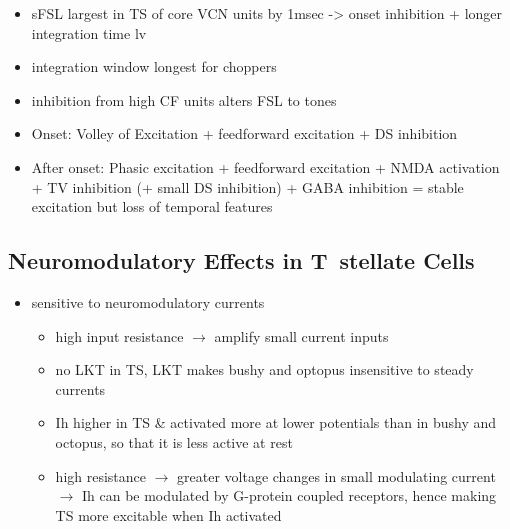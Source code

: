 \begin{itemize}
\item sFSL largest in TS of core VCN units by 1msec -> onset inhibition + longer integration time \citep{GisbergenGrashuisEtAl:1975,GisbergenGrashuisEtAl:1975a,GisbergenGrashuisEtAl:1975b,YoungRobertEtAl:1988,PaoliniClareyEtAl:2004}
  lv\item integration window longest for choppers \citep{McGinleyOertel:2006}
\item inhibition from high CF units alters FSL to tones \citep{Wickesberg:1996}
\item Onset: Volley of Excitation + feedforward excitation + DS inhibition
\item After onset: Phasic excitation + feedforward excitation + NMDA activation + TV inhibition (+ small DS inhibition) + GABA inhibition = stable excitation but loss of temporal features
\end{itemize}

\citep{JorisSmithEtAl:1994}


\subsection{Neuromodulatory Effects in T~stellate Cells}




\begin{itemize}
\item sensitive to neuromodulatory currents \citep{FujinoOertel:2001}
\begin{itemize}
\item high input resistance $\rightarrow$ amplify small current inputs \citep{FujinoOertel:2001}
\item no LKT in TS,  LKT makes bushy and optopus insensitive to steady currents \citep{OertelFujino:2001,McGinleyOertel:2006}
\item Ih higher in TS \& activated more at lower potentials than in bushy and octopus, so that it is less active at rest
\item high resistance $\rightarrow$ greater voltage changes in small modulating current $\rightarrow$ Ih can be modulated by G-protein coupled receptors, hence making TS more excitable when Ih activated \citep{RodriguesOertel:2006}
\end{itemize}
\end{itemize}

